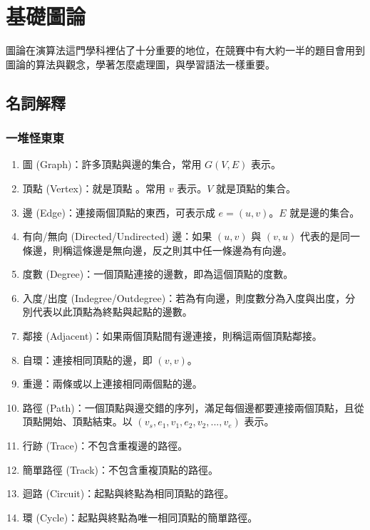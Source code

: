 \chapter{基礎圖論}

圖論在演算法這門學科裡佔了十分重要的地位，在競賽中有大約一半的題目會用到圖論的算法與觀念，學著怎麼處理圖，與學習語法一樣重要。\\

\section{名詞解釋}
\subsection{一堆怪東東}

\begin{enumerate}
\item 圖 (Graph)：許多頂點與邊的集合，常用 $G(V, E)$ 表示。
\item 頂點 (Vertex)：就是頂點 。常用 $v$ 表示。$V$ 就是頂點的集合。
\item 邊 (Edge)：連接兩個頂點的東西，可表示成 $e = (u, v)$。$E$ 就是邊的集合。
\item 有向/無向 (Directed/Undirected) 邊：如果 $(u, v)$ 與 $(v, u)$ 代表的是同一條邊，則稱這條邊是無向邊，反之則其中任一條邊為有向邊。
\item 度數 (Degree)：一個頂點連接的邊數，即為這個頂點的度數。
\item 入度/出度 (Indegree/Outdegree)：若為有向邊，則度數分為入度與出度，分別代表以此頂點為終點與起點的邊數。
\item 鄰接 (Adjacent)：如果兩個頂點間有邊連接，則稱這兩個頂點鄰接。
\item 自環：連接相同頂點的邊，即 $(v, v)$。
\item 重邊：兩條或以上連接相同兩個點的邊。
\item 路徑 (Path)：一個頂點與邊交錯的序列，滿足每個邊都要連接兩個頂點，且從頂點開始、頂點結束。以 $(v_s, e_1, v_1, e_2, v_2, ..., v_e)$ 表示。
\item 行跡 (Trace)：不包含重複邊的路徑。
\item 簡單路徑 (Track)：不包含重複頂點的路徑。
\item 迴路 (Circuit)：起點與終點為相同頂點的路徑。
\item 環 (Cycle)：起點與終點為唯一相同頂點的簡單路徑。
\end{enumerate}

